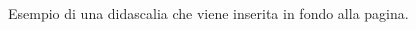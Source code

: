 \documentclass[hidelinks,12pt,a4paper]{article}
\begin{document}
\begin{adjustwidth}{-30mm}{-30mm}
\begin{minipage}{\linewidth}
{\begin{minipage} [l] [\dimexpr 0.430\textwidth \relax] [t] {\dimexpr .460\textwidth \relax}
					\vspace*{\fill}
					\fboxrule=4pt{
					\framebox[\textwidth]{\rule{0pt}{55pt}}}
					
				\end{minipage}
		}%
			\hfill{
			}
		\end{minipage}
	
	\vspace{4mm}
	
		\begin{minipage}{\linewidth}
		\hfill{
		}
	\end{minipage}
	\end{adjustwidth}

	
	\vspace*{\fill}
	\centering
	\fboxrule=2pt
	\fbox
	{
		\begin{minipage}{\linewidth}
		Esempio di una didascalia che viene inserita in fondo alla pagina.
		\end{minipage}
	}
	
	\newpage
	\framebox[\textwidth]{\rule{0pt}{30pt}}
\end{document}
